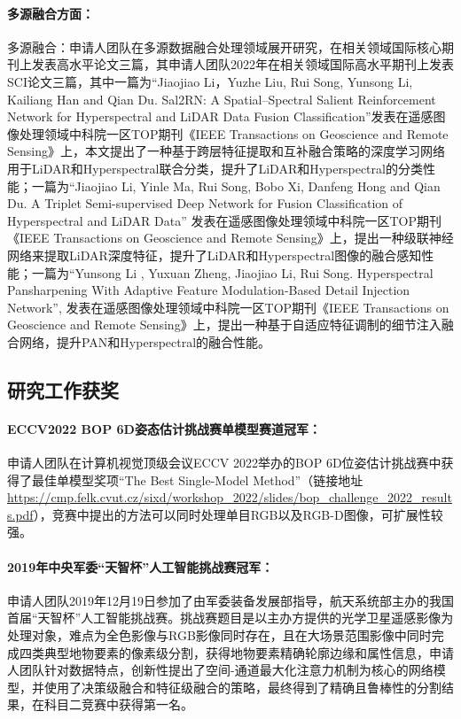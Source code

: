 \documentclass[12pt]{article}
\newcommand{\myPara}[1]{\paragraph{#1：}}
\begin{document}
\myPara{多源融合方面}
多源融合：申请人团队在多源数据融合处理领域展开研究，在相关领域国际核心期刊上发表高水平论文三篇，其申请人团队2022年在相关领域国际高水平期刊上发表SCI论文三篇，其中一篇为“Jiaojiao Li，Yuzhe Liu, Rui Song, Yunsong Li, Kailiang Han and Qian Du. Sal2RN: A Spatial–Spectral Salient Reinforcement Network for Hyperspectral and LiDAR Data Fusion Classification”发表在遥感图像处理领域中科院一区TOP期刊《IEEE Transactions on Geoscience and Remote Sensing》上，本文提出了一种基于跨层特征提取和互补融合策略的深度学习网络用于LiDAR和Hyperspectral联合分类，提升了LiDAR和Hyperspectral的分类性能；一篇为“Jiaojiao Li, Yinle Ma, Rui Song, Bobo Xi, Danfeng Hong and Qian Du. A Triplet Semi-supervised Deep Network for Fusion Classification of Hyperspectral and LiDAR Data” 发表在遥感图像处理领域中科院一区TOP期刊《IEEE Transactions on Geoscience and Remote Sensing》上，提出一种级联神经网络来提取LiDAR深度特征，提升了LiDAR和Hyperspectral图像的融合感知性能；一篇为“Yunsong Li , Yuxuan Zheng, Jiaojiao Li, Rui Song. Hyperspectral Pansharpening With Adaptive Feature Modulation-Based Detail Injection Network”, 发表在遥感图像处理领域中科院一区TOP期刊《IEEE Transactions on Geoscience and Remote Sensing》上，提出一种基于自适应特征调制的细节注入融合网络，提升PAN和Hyperspectral的融合性能。


\subsection{研究工作获奖}

\myPara{ECCV2022 BOP 6D姿态估计挑战赛单模型赛道冠军}
申请人团队在计算机视觉顶级会议ECCV 2022举办的BOP 6D位姿估计挑战赛中获得了最佳单模型奖项“The Best Single-Model Method”（链接地址\url{https://cmp.felk.cvut.cz/sixd/workshop_2022/slides/bop_challenge_2022_results.pdf}），竞赛中提出的方法可以同时处理单目RGB以及RGB-D图像，可扩展性较强。

\myPara{2019年中央军委“天智杯”人工智能挑战赛冠军}
申请人团队2019年12月19日参加了由军委装备发展部指导，航天系统部主办的我国首届“天智杯”人工智能挑战赛。挑战赛题目是以主办方提供的光学卫星遥感影像为处理对象，难点为全色影像与RGB影像同时存在，且在大场景范围影像中同时完成四类典型地物要素的像素级分割，获得地物要素精确轮廓边缘和属性信息，申请人团队针对数据特点，创新性提出了空间-通道最大化注意力机制为核心的网络模型，并使用了决策级融合和特征级融合的策略，最终得到了精确且鲁棒性的分割结果，在科目二竞赛中获得第一名。

\end{document}
